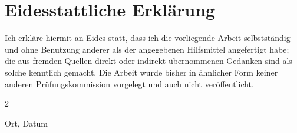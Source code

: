 \newpage\null\thispagestyle{empty}\newpage
\chapter*{Eidesstattliche Erklärung}
\thispagestyle{empty}
Ich erkl\"are hiermit an Eides statt, dass ich die vorliegende Arbeit selbstst\"andig und ohne Benutzung anderer als der angegebenen Hilfsmittel angefertigt habe; die aus fremden Quellen direkt oder indirekt \"ubernommenen Gedanken sind als solche kenntlich gemacht. Die Arbeit wurde bisher in \"ahnlicher Form keiner anderen Pr\"ufungskommission vorgelegt und auch nicht ver\"offentlicht.

\bigskip
\bigskip
\bigskip
\bigskip
	
   \begin{multicols}{2}
      \raggedright
      Ort, Datum
        
      \raggedleft
      \authorname
      
   \end{multicols}
